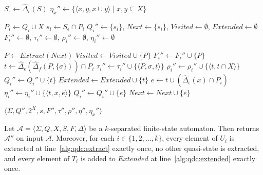   \SetAlgoNoLine
  \begin{algorithm}[!ht]
    \caption{Per-component quasi-determinization of a k-separated finite-state
      automaton}
    \label{alg:quasi_det_sfsa_components}

    \DontPrintSemicolon

    $S_\epsilon \gets \hat{\Delta}_\epsilon(S)$\;
    $\eta_x'' \gets \{ \langle x, y, x \cup y \rangle \mid x, y \subseteq X
      \}$\;

     {
      $P_i \gets Q_i \cup X$\;
      $s_i \gets S_\epsilon \cap P_i$\;
      $Q_i'' \gets \{ s_i \}$, $Next \gets \{ s_i \}$, $Visited \gets \emptyset$,
      $Extended \gets \emptyset$\;
      $F_i'' \gets \emptyset$, $\tau_i'' \gets \emptyset$, $\rho_i'' \gets \emptyset$,
      $\eta_i'' \gets \emptyset$\;

       {
        $P \gets Extract(Next)$\;
        $Visited \gets Visited \cup \{ P \}$\;
         {
          $F_i'' \gets F_i'' \cup \{ P \}$\;
        }
        \For {$\sigma \in \Sigma$} {
          $t \gets \hat{\Delta}_\epsilon(\hat{\Delta}_f(P, \{ \sigma \})) \cap
            P_i$\;
          $\tau_i'' \gets \tau_i'' \cup \{ \langle P, \sigma, t \rangle \}$\;
          $\rho_i'' \gets \rho_i'' \cup \{ \langle t, t \cap X \rangle \}$\;
          $Q_i'' \gets Q_i'' \cup \{ t \}$\;
           {
            $Extended \gets Extended \cup \{ t \}$\;
             {
              $e \gets t \cup (\hat{\Delta}_\epsilon(x) \cap P_i)$\;
              $\eta_i'' \gets \eta_i'' \cup \{ \langle t, x, e \rangle \}$\;
              $Q_i'' \gets Q_i'' \cup \{ e \}$\;
               {
                $Next \gets Next \cup \{ e \}$\;
              }
            }
          }
        }
      }
    }

    \Return $\langle \Sigma, Q'', 2^X, s, F'', \tau'', \rho'', \eta'', \eta_x'' \rangle$
  \end{algorithm}

  \begin{proposition}\label{prop:quasidet_components_algorithm}
    Let $\mathcal{A} = \langle \Sigma, Q, X, S, F, \Delta \rangle$ be a
    $k$-separated finite-state automaton. Then 
    returns $\mathcal{A}''$ on input $\mathcal{A}$. Moreover, for each $i \in \{ 1, 2,
    \ldots, k \}$, every element of $U_i$ is extracted at line~\ref{alg:qdc:extract}
    exactly once, no other quasi-state is extracted, and every element of $T_i$ is
    added to $Extended$ at line~\ref{alg:qdc:extended} exactly once.
  \end{proposition}

